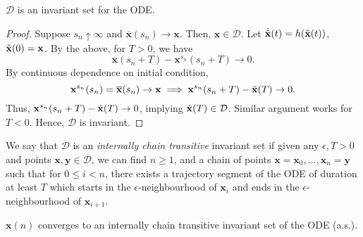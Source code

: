 \begin{prop}
    $\mathcal{D}$ is an invariant set for the ODE.
\end{prop}
\begin{proof}
    Suppose $s_n \uparrow \infty$ and $\overline{\mathbf{x}}(s_n) \to \mathbf{x}$. Then, $\mathbf{x} \in \mathcal{D}$. Let $\dot{\Tilde{\mathbf{x}}}(t) = h(\Tilde{\mathbf{x}}(t))$, $\Tilde{\mathbf{x}}(0) = \mathbf{x}$. By the above, for $T > 0$, we have
    \[
        \overline{\mathbf{x}}(s_n + T) - \mathbf{x}^{s_n}(s_n + T) \to 0.
    \]
    By continuous dependence on initial condition, 
    \[
        \mathbf{x}^{s_n}(s_n)  = \overline{\mathbf{x}}(s_n) \to \mathbf{x} \implies \mathbf{x}^{s_n}(s_n + T) - \Tilde{\mathbf{x}}(T) \to 0.
    \]
    Thus, 
        $\mathbf{x}^{s_n}(s_n + T)- \Tilde{\mathbf{x}}(T) \to 0$,
    implying $\Tilde{\mathbf{x}}(T) \in \mathcal{D}$. Similar argument works for $T < 0$. Hence, $\mathcal{D}$ is invariant.
\end{proof}

\begin{defn}
    We say that $\mathcal{D}$ is an \emph{internally chain transitive} invariant set if given any $\epsilon, T > 0$ and points $\mathbf{x,y} \in \mathcal{D}$, we can find $n \geq 1$, and a chain of points $\mathbf{x} = \mathbf{x}_0, \ldots , \mathbf{x}_n = \mathbf{y}$ such that for $0 \leq i < n$, there exists a trajectory segment of the ODE of duration at least $T$ which starts in the $\epsilon$-neighbourhood of $\mathbf{x}_i$ and ends in the $\epsilon$-neighbourhood of $\mathbf{x}_{i+1}$. 
\end{defn}

\begin{thm}
    $\mathbf{x}(n)$ converges to an internally chain transitive invariant set of the ODE (a.s.).
\end{thm}
